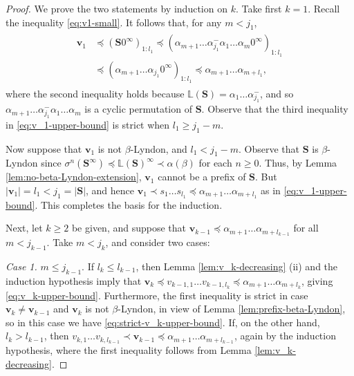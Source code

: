 \documentclass[11pt]{amsart}
\theoremstyle{definition}
\theoremstyle{remark}
\numberwithin{equation}{section}
\renewcommand{\L}{\ensuremath{\mathbb{L}}}
\newcommand{\cs}{ {\mathbf{S}}}
\renewcommand{\u}{\mathbf{u}}
\renewcommand{\v}{\mathbf{v}}
\newcommand{\f}{\infty}
\newcommand{\al}{\alpha}
\newcommand{\lle}{\preccurlyeq}
\newcommand{\lge}{\succcurlyeq}
\newcommand{\si}{\sigma}
\begin{document}
\begin{proof}
We prove the two statements by induction on $k$. Take first $k=1$. Recall the inequality \eqref{eq:v1-small}.
It follows that, for any $m<j_1$,
\begin{align}
\begin{split}
\v_1&\lle (\cs 0^\f)_{1:l_1}\lle (\al_{m+1}\dots \al_{j_1}^-\al_1\dots\al_m 0^\f)_{1:l_1}\\
&\lle (\al_{m+1}\dots \al_{j_1}0^\f)_{1:l_1}\lle \al_{m+1}\dots \al_{m+l_1},
\end{split}
\label{eq:v_1-upper-bound}
\end{align}
where the second inequality holds because $\L(\cs)=\al_1\dots\al_{j_1}^-$, and so $\al_{m+1}\dots \al_{j_1}^-\al_1\dots\al_m$ is a cyclic permutation of $\cs$. Observe that the third inequality in \eqref{eq:v_1-upper-bound} is strict when $l_1\geq j_1-m$.

Now suppose that $\v_1$ is not $\beta$-Lyndon, and $l_1<j_1-m$. Observe that $\cs$ is $\beta$-Lyndon since $\si^n(\cs^\f)\lle \L(\cs)^\f \prec\al(\beta)$ for each $n\geq 0$. Thus, by Lemma \ref{lem:no-beta-Lyndon-extension}, $\v_1$ cannot be a prefix of $\cs$. But $|\v_1|=l_1<j_1=|\cs|$, and hence $\v_1\prec s_1\dots s_{l_1}\lle \al_{m+1}\dots\al_{m+l_1}$ as in \eqref{eq:v_1-upper-bound}. This completes the basis for the induction.

Next, let $k\geq 2$ be given, and suppose that $\v_{k-1}\lle \al_{m+1}\dots\al_{m+l_{k-1}}$ for all $m<j_{k-1}$. Take $m<j_k$, and consider two cases:

\medskip
{\em Case 1.} $m\leq j_{k-1}$. If $l_k\leq l_{k-1}$, then Lemma \ref{lem:v_k-decreasing} (ii) and the induction hypothesis imply that $\v_k\lle v_{k-1,1}\dots v_{k-1,l_k}\lle \al_{m+1}\dots \al_{m+l_k}$, giving \eqref{eq:v_k-upper-bound}. Furthermore, the first inequality is strict in case $\v_k\neq \v_{k-1}$ and $\v_k$ is not $\beta$-Lyndon, in view of Lemma \ref{lem:prefix-beta-Lyndon}, so in this case we have \eqref{eq:strict-v_k-upper-bound}. If, on the other hand, $l_k>l_{k-1}$, then $v_{k,1}\dots v_{k,l_{k-1}}\prec \v_{k-1}\lle \al_{m+1}\dots\al_{m+l_{k-1}}$, again by the induction hypothesis, where the first inequality follows from Lemma \ref{lem:v_k-decreasing}.


\end{proof}
\end{document}
